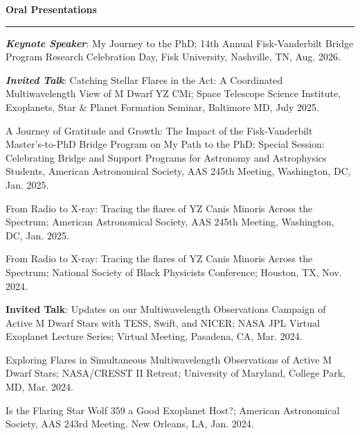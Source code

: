 \documentclass[12pt]{article}
\begin{document}
\noindent
{\bf Oral Presentations} \\
\vspace{-10mm}
\begin{center}
\rule{\textwidth}{0.2mm}
\end{center}
\vspace{-3mm}
\noindent
\begin{etaremune}
\renewcommand\labelenumi{\bfseries\theenumi .}

\item \textit{\textbf{Keynote Speaker}}: My Journey to the PhD; 
14th Annual Fisk-Vanderbilt Bridge Program Research Celebration Day, Fisk University, Nashville, TN, Aug. 2026.


\item \textit{\textbf{Invited Talk}}: Catching Stellar Flares in the Act: A Coordinated Multiwavelength View of M Dwarf YZ CMi; Space Telescope Science Institute, Exoplanets, Star \& Planet Formation Seminar, Baltimore MD, July 2025.

\item A Journey of Gratitude and Growth: The Impact of the Fisk-Vanderbilt Master's-to-PhD Bridge Program on My Path to the PhD; Special Session: Celebrating Bridge and Support Programs for Astronomy and Astrophysics Students, American Astronomical Society, AAS 245th Meeting, Washington, DC, Jan. 2025.

\item From Radio to X-ray: Tracing the flares of YZ Canis Minoris Across the Spectrum; American Astronomical Society, AAS 245th Meeting, Washington, DC, Jan. 2025.

\item From Radio to X-ray: Tracing the flares of YZ Canis Minoris Across the Spectrum; National Society of Black Physicists Conference; Houston, TX, Nov. 2024.

\item \textbf{Invited Talk}: Updates on our Multiwavelength Observations Campaign of Active M Dwarf Stars with TESS, Swift, and NICER; NASA JPL Virtual Exoplanet Lecture Series; Virtual Meeting, Pasadena, CA, Mar. 2024. 

\item Exploring Flares in Simultaneous Multiwavelength Observations of Active M Dwarf Stars; NASA/CRESST II Retreat; University of Maryland, College Park, MD, Mar. 2024. 

\item Is the Flaring Star Wolf 359 a Good Exoplanet Host?; American Astronomical Society, AAS 243rd Meeting. New Orleans, LA, Jan. 2024.


\end{etaremune}
\end{document}
